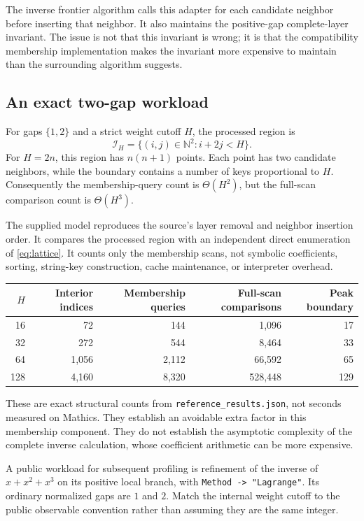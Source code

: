 \documentclass[11pt,letterpaper]{article}
\newcommand{\code}[1]{\nolinkurl{#1}}
\newcommand{\N}{\mathbb{N}}
\begin{document}
The inverse frontier algorithm calls this adapter for each candidate
neighbor before inserting that neighbor. It also maintains the positive-gap
complete-layer invariant. The issue is not that this invariant is wrong;
it is that the compatibility membership implementation makes the invariant
more expensive to maintain than the surrounding algorithm suggests.

\subsection{An exact two-gap workload}
For gaps $\{1,2\}$ and a strict weight cutoff $H$, the processed region is
\begin{equation}
 \mathcal I_H=\{(i,j)\in\N^2:i+2j<H\}.
 \label{eq:lattice}
\end{equation}
For $H=2n$, this region has $n(n+1)$ points. Each point has two candidate
neighbors, while the boundary contains a number of keys proportional to
$H$. Consequently the membership-query count is $\Theta(H^2)$, but the
full-scan comparison count is $\Theta(H^3)$.

The supplied model reproduces the source's layer removal and neighbor
insertion order. It compares the processed region with an independent direct
enumeration of \eqref{eq:lattice}. It counts only the membership scans, not
symbolic coefficients, sorting, string-key construction, cache maintenance,
or interpreter overhead.

\begin{center}
\begin{tabular}{rrrrr}
\toprule
$H$ & Interior indices & Membership queries & Full-scan comparisons & Peak boundary\\
\midrule
16 & 72 & 144 & 1,096 & 17\\
32 & 272 & 544 & 8,464 & 33\\
64 & 1,056 & 2,112 & 66,592 & 65\\
128 & 4,160 & 8,320 & 528,448 & 129\\
\bottomrule
\end{tabular}
\end{center}

These are exact structural counts from \code{reference_results.json}, not
seconds measured on Mathics. They establish an avoidable extra factor in
this membership component. They do not establish the asymptotic complexity
of the complete inverse calculation, whose coefficient arithmetic can be
more expensive.

A public workload for subsequent profiling is refinement of the inverse
of $x+x^2+x^3$ on its positive local branch, with \code{Method -> "Lagrange"}.
Its ordinary normalized gaps are $1$ and $2$. Match the internal weight
cutoff to the public observable convention rather than assuming they are
the same integer.
\end{document}
